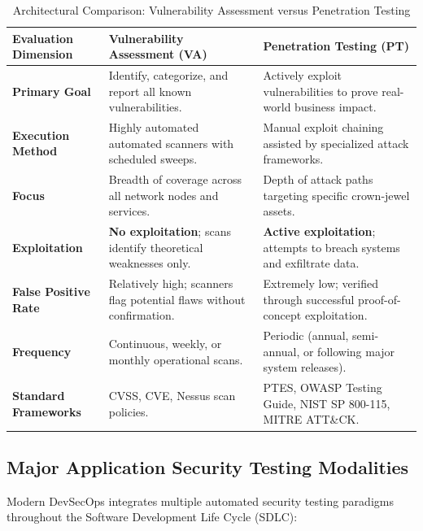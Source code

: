 \begin{table}[htbp]
\centering
\caption{Architectural Comparison: Vulnerability Assessment versus Penetration Testing}
\label{tab:va_vs_pt}
\begin{tabularx}{\textwidth}{p{3.2cm} X X}
\toprule
\textbf{Evaluation Dimension} & \textbf{Vulnerability Assessment (VA)} & \textbf{Penetration Testing (PT)} \\
\midrule
\textbf{Primary Goal} & Identify, categorize, and report all known vulnerabilities. & Actively exploit vulnerabilities to prove real-world business impact. \\
\textbf{Execution Method} & Highly automated automated scanners with scheduled sweeps. & Manual exploit chaining assisted by specialized attack frameworks. \\
\textbf{Focus} & Breadth of coverage across all network nodes and services. & Depth of attack paths targeting specific crown-jewel assets. \\
\textbf{Exploitation} & \textbf{No exploitation}; scans identify theoretical weaknesses only. & \textbf{Active exploitation}; attempts to breach systems and exfiltrate data. \\
\textbf{False Positive Rate} & Relatively high; scanners flag potential flaws without confirmation. & Extremely low; verified through successful proof-of-concept exploitation. \\
\textbf{Frequency} & Continuous, weekly, or monthly operational scans. & Periodic (annual, semi-annual, or following major system releases). \\
\textbf{Standard Frameworks} & CVSS, CVE, Nessus scan policies. & PTES, OWASP Testing Guide, NIST SP 800-115, MITRE ATT\&CK. \\
\bottomrule
\end{tabularx}
\end{table}

\subsection{Major Application Security Testing Modalities}

Modern DevSecOps integrates multiple automated security testing paradigms throughout the Software Development Life Cycle (SDLC):

